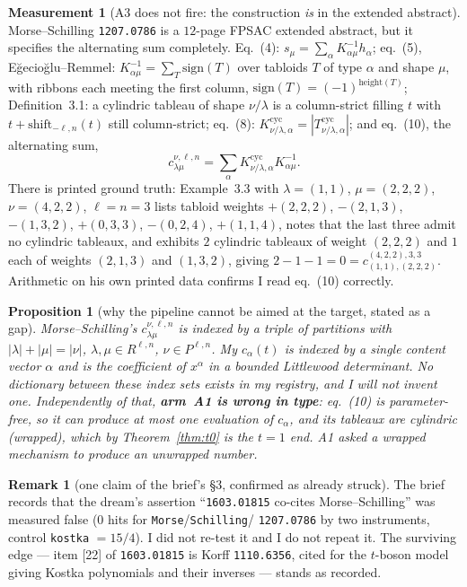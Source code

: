 \documentclass[11pt]{article}
\theoremstyle{plain}
\newtheorem{proposition}[theorem]{Proposition}
\theoremstyle{definition}
\newtheorem{remark}[theorem]{Remark}
\newtheorem{measurement}[theorem]{Measurement}
\begin{document}
\begin{measurement}[A3 does not fire: the construction \emph{is} in the extended abstract]
Morse--Schilling \texttt{1207.0786} is a $12$-page FPSAC extended abstract, but it specifies
the alternating sum completely. Eq.~(4): $s_\mu=\sum_\alpha K^{-1}_{\alpha\mu}h_\alpha$;
eq.~(5), E\u{g}ecio\u{g}lu--Remmel: $K^{-1}_{\alpha\mu}=\sum_T\mathrm{sign}(T)$ over tabloids
$T$ of type $\alpha$ and shape $\mu$, with ribbons each meeting the first column,
$\mathrm{sign}(T)=(-1)^{\mathrm{height}(T)}$; Definition~3.1: a cylindric tableau of shape
$\nu/\lambda$ is a column-strict filling $t$ with $t+\mathrm{shift}_{-\ell,n}(t)$ still
column-strict; eq.~(8): $K^{\mathrm{cyc}}_{\nu/\lambda,\alpha}=|T^{\mathrm{cyc}}_{\nu/\lambda,\alpha}|$;
and eq.~(10), the alternating sum,
\[
  c^{\nu,\ell,n}_{\lambda\mu}=\sum_\alpha K^{\mathrm{cyc}}_{\nu/\lambda,\alpha}K^{-1}_{\alpha\mu}.
\]
There is printed ground truth: Example~3.3 with $\lambda=(1,1)$, $\mu=(2,2,2)$,
$\nu=(4,2,2)$, $\ell=n=3$ lists tabloid weights $+(2,2,2)$, $-(2,1,3)$, $-(1,3,2)$,
$+(0,3,3)$, $-(0,2,4)$, $+(1,1,4)$, notes that the last three admit no cylindric tableaux,
and exhibits $2$ cylindric tableaux of weight $(2,2,2)$ and $1$ each of weights $(2,1,3)$ and
$(1,3,2)$, giving $2-1-1=0=c^{(4,2,2),3,3}_{(1,1),(2,2,2)}$. Arithmetic on his own printed
data confirms I read eq.~(10) correctly.
\end{measurement}

\begin{proposition}[why the pipeline cannot be aimed at the target, stated as a gap]
Morse--Schilling's $c^{\nu,\ell,n}_{\lambda\mu}$ is indexed by a \emph{triple} of partitions
with $|\lambda|+|\mu|=|\nu|$, $\lambda,\mu\in R^{\ell,n}$, $\nu\in P^{\ell,n}$. My
$c_\alpha(t)$ is indexed by a \emph{single content vector} $\alpha$ and is the coefficient of
$x^\alpha$ in a bounded Littlewood determinant. No dictionary between these index sets exists
in my registry, and I will not invent one. Independently of that, \textbf{arm~A1 is wrong in
type}: eq.~(10) is parameter-free, so it can produce at most one evaluation of $c_\alpha$,
and its tableaux are \emph{cylindric} (wrapped), which by Theorem~\ref{thm:t0} is the $t=1$
end. A1 asked a wrapped mechanism to produce an unwrapped number.
\end{proposition}

\begin{remark}[one claim of the brief's \S3, confirmed as already struck]
The brief records that the dream's assertion ``\texttt{1603.01815} co-cites
Morse--Schilling'' was measured false ($0$ hits for \texttt{Morse}/\texttt{Schilling}/
\texttt{1207.0786} by two instruments, control \texttt{kostka} $=15/4$). I did not re-test
it and I do not repeat it. The surviving edge --- item [22] of \texttt{1603.01815} is Korff
\texttt{1110.6356}, cited for the $t$-boson model giving Kostka polynomials and their
inverses --- stands as recorded.
\end{remark}
\end{document}
